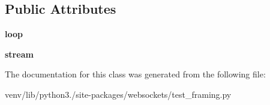 \subsection*{Public Attributes}
\begin{DoxyCompactItemize}
\item 
\mbox{\label{classwebsockets_1_1test__framing_1_1_framing_tests_ae5acc52c0ba7e79d83b935a5d4d7fcb2}} 
{\bfseries loop}
\item 
\mbox{\label{classwebsockets_1_1test__framing_1_1_framing_tests_a3eb0f31dfb50393d855d50b5c4938968}} 
{\bfseries stream}
\end{DoxyCompactItemize}


The documentation for this class was generated from the following file\+:\begin{DoxyCompactItemize}
\item 
venv/lib/python3./site-\/packages/websockets/test\+\_\+framing.\+py\end{DoxyCompactItemize}
